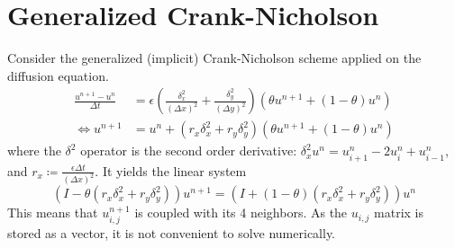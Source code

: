 \documentclass[12pt, openany]{report}
\theoremstyle{definition}
\begin{document}
\section{Generalized Crank-Nicholson}
Consider the generalized (implicit) Crank-Nicholson scheme applied on the diffusion equation. 
\begin{equation}
	\begin{aligned}
		\frac{u^{n+1}-u^n}{\Delta t} &= \epsilon \left(\frac{\delta_x^2}{(\Delta x)^2} + \frac{\delta_y^2}{(\Delta y)^2}\right) \left(\theta u^{n+1} + (1-\theta)u^n\right)\\
		\Longleftrightarrow u^{n+1} &= u^n + (r_x \delta_x^2 + r_y \delta_y^2) \left(\theta u^{n+1} + (1-\theta)u^n\right)
	\end{aligned}
\end{equation}
where the $\delta^2$ operator is the second order derivative: $\delta_x^2 u^n = u^n_{i+1}-2u_i^n + u_{i-1}^n$, and $r_x\coloneqq \frac{\epsilon \Delta t}{(\Delta x)^2}$. It yields the linear system 
\begin{equation}\label{eq:CN}
	\left(I-\theta (r_x\delta_x^2 + r_y \delta_y^2)\right) u^{n+1} = \left(I+(1-\theta)(r_x\delta_x^2 + r_y \delta_y^2)\right)u^n
\end{equation}
This means that $u_{i,j}^{n+1}$ is coupled with its 4 neighbors. As the $u_{i,j}$ matrix is stored as a vector, it is not convenient to solve numerically. \\
\end{document}
